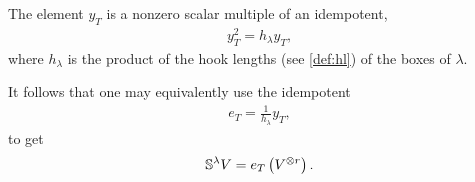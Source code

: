 \documentclass[11pt]{amsart}
\begin{document}
\begin{prop}
    The element $y_T$ is a nonzero scalar multiple of an idempotent,
    \begin{align}
        y_T^2 = h_\lambda y_T,
    \end{align}
    where $h_\lambda$ is the product of the hook lengths (see \cref{def:hl}) of the boxes of $\lambda$. 
\end{prop}

It follows that one may equivalently use the idempotent
\begin{align}
    e_T = \frac{1}{h_\lambda} y_T,
\end{align}
to get
\begin{align}\label{eq:eTV}
    \mathbb{S}^\lambda V
        =
        e_T\left(V^{\otimes r}\right).
\end{align}
\end{document}
